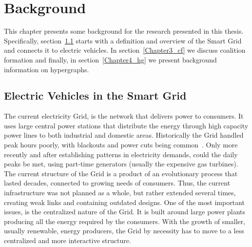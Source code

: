 \chapter{Background}
\label{Chapter2_bg}
This chapter presents some background for the research presented in this thesis. Specifically, section~\ref{Chapter2_evs} starts with a definition and overview of the Smart Grid and connects it to electric vehicles. In section~\ref{Chapter3_cf} we discuss coalition formation and finally, in section~\ref{Chapter4_hg} we present background information on hypergraphs.

\section{Electric Vehicles in the Smart Grid} %

\label{Chapter2_evs} %


The current electricity Grid, is the network that delivers power to consumers. It uses large central power stations that distribute the energy through high capacity power lines to both industrial and domestic areas. Historically the Grid handled peak hours poorly, with blackouts and power cuts being common~\cite{gorowitz2000general}. Only more recently and after establishing patterns in electricity demands, could the daily peaks be met, using part-time generators (usually the expensive gas turbines). The current structure of the Grid is a product of an evolutionary process that lasted decades, connected to growing needs of consumers. Thus, the current infrastructure was not planned as a whole, but rather extended several times, creating weak links and containing outdated designs. One of the most important issues, is the centralized nature of the Grid. It is built around large power plants producing all the energy required by the consumers. With the growth of smaller, usually renewable, energy producers, the Grid by necessity has to move to a less centralized and more interactive structure.

